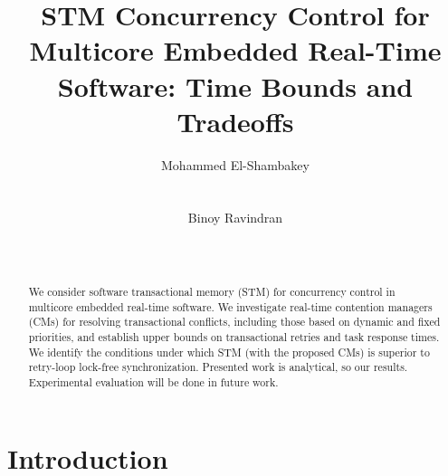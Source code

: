 \documentclass{sig-alternate}
\begin{document}

\title{STM Concurrency Control for Multicore Embedded Real-Time Software: Time Bounds and Tradeoffs%
}


\author{
\alignauthor Mohammed El-Shambakey\\
\\
\\
\alignauthor Binoy Ravindran\\
\\
\\
}

\maketitle

\begin{abstract}
We consider software transactional memory (STM) for concurrency control in multicore embedded real-time software. We investigate real-time contention managers (CMs) for resolving transactional conflicts, including those based on dynamic and fixed priorities, and establish upper bounds on transactional retries and task response times. We identify the conditions under which STM (with the proposed CMs) is superior to retry-loop lock-free synchronization. Presented work is analytical, so our results. Experimental evaluation will be done in future work.

\end{abstract}



\section{Introduction}
\label{sec:intro}
\end{document}
